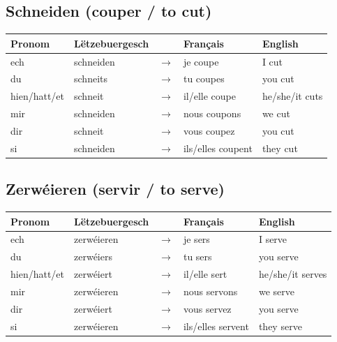 \subsection*{Schneiden (couper / to cut)}
\begin{tabular}{ll c l l}
\toprule
\textbf{Pronom} & \textbf{Lëtzebuergesch} & \textbf{} & \textbf{Français} & \textbf{English} \\
\midrule
ech & schneiden & $\rightarrow$ & je coupe & I cut \\
du & schneits & $\rightarrow$ & tu coupes & you cut \\
hien/hatt/et & schneit & $\rightarrow$ & il/elle coupe & he/she/it cuts \\
mir & schneiden & $\rightarrow$ & nous coupons & we cut \\
dir & schneit & $\rightarrow$ & vous coupez & you cut \\
si & schneiden & $\rightarrow$ & ils/elles coupent & they cut \\
\bottomrule
\end{tabular}

\subsection*{Zerwéieren (servir / to serve)}
\begin{tabular}{ll c l l}
\toprule
\textbf{Pronom} & \textbf{Lëtzebuergesch} & \textbf{} & \textbf{Français} & \textbf{English} \\
\midrule
ech & zerwéieren & $\rightarrow$ & je sers & I serve \\
du & zerwéiers & $\rightarrow$ & tu sers & you serve \\
hien/hatt/et & zerwéiert & $\rightarrow$ & il/elle sert & he/she/it serves \\
mir & zerwéieren & $\rightarrow$ & nous servons & we serve \\
dir & zerwéiert & $\rightarrow$ & vous servez & you serve \\
si & zerwéieren & $\rightarrow$ & ils/elles servent & they serve \\
\bottomrule
\end{tabular}

